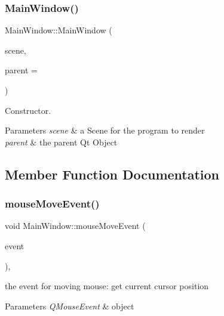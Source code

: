 \subsubsection{\texorpdfstring{Main\+Window()}{MainWindow()}}
{\footnotesize\ttfamily Main\+Window\+::\+Main\+Window (\begin{DoxyParamCaption}\item[{unique\+\_\+ptr$<$ \mbox{\hyperlink{class_scene_manager}{Scene\+Manager}} $>$}]{scene,  }\item[{Q\+Widget $\ast$}]{parent = {} }\end{DoxyParamCaption})}



Constructor. 


\begin{DoxyParams}{Parameters}
{\em scene} & a Scene for the program to render \\
\hline
{\em parent} & the parent Qt Object \\
\hline
\end{DoxyParams}


\subsection{Member Function Documentation}
\mbox{\label{class_main_window_a9c8748d463f01ddae6abcd8f8163fcef}} 
\subsubsection{\texorpdfstring{mouse\+Move\+Event()}{mouseMoveEvent()}}
{\footnotesize\ttfamily void Main\+Window\+::mouse\+Move\+Event (\begin{DoxyParamCaption}\item[{Q\+Mouse\+Event $\ast$}]{event }\end{DoxyParamCaption})\hspace{0.3cm}{\ttfamily [override]}, {\ttfamily [protected]}}



the event for moving mouse\+: get current cursor position 


\begin{DoxyParams}{Parameters}
{\em Q\+Mouse\+Event} & object \\
\hline
\end{DoxyParams}
\mbox{\label{class_main_window_a1dff511c9697cbcb60150894f480b9c8}} 
